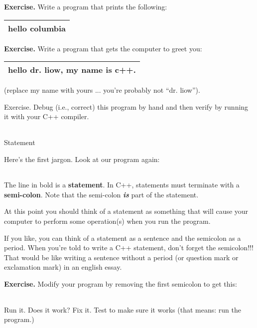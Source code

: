 \documentclass[
]{article}
\begin{document}
\textbf{Exercise.} Write a program that prints the following:

\begin{longtable}[]{@{}l@{}}
\toprule
\endhead
hello columbia\tabularnewline
\bottomrule
\end{longtable}

\textbf{Exercise.} Write a program that gets the computer to greet you:

\begin{longtable}[]{@{}l@{}}
\toprule
\endhead
hello dr. liow, my name is c++.\tabularnewline
\bottomrule
\end{longtable}

(replace my name with yours ... you're probably not ``dr. liow'').

Exercise. Debug (i.e., correct) this program by hand and then verify by
running it with your C++ compiler.

\begin{longtable}[]{@{}@{}}
\toprule
\endhead
\bottomrule
\end{longtable}

Statement

Here's the first jargon. Look at our program again:

\begin{longtable}[]{@{}@{}}
\toprule
\endhead
\bottomrule
\end{longtable}

The line in bold is a \textbf{statement}. In C++, statements must
terminate with a \textbf{semi-colon}. Note that the semi-colon
\emph{\textbf{is}} part of the statement.

At this point you should think of a statement as something that will
cause your computer to perform some operation(s) when you run the
program.

If you like, you can think of a statement as a sentence and the
semicolon as a period. When you're told to write a C++ statement, don't
forget the semicolon!!! That would be like writing a sentence without a
period (or question mark or exclamation mark) in an english essay.

\textbf{Exercise.} Modify your program by removing the first semicolon
to get this:

\begin{longtable}[]{@{}@{}}
\toprule
\endhead
\bottomrule
\end{longtable}

Run it. Does it work? Fix it. Test to make sure it works (that means:
run the program.)
\end{document}
